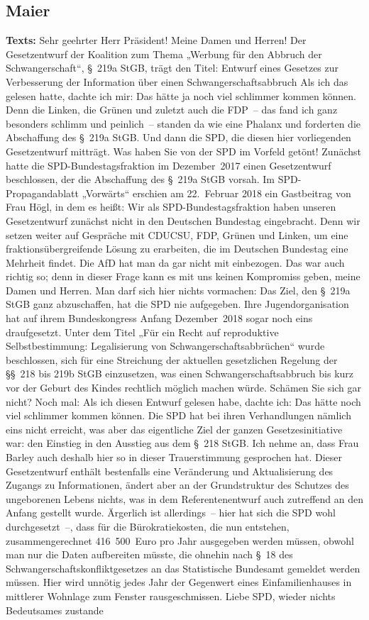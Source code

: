 \documentclass{article}
\begin{document}
\subsection{Maier}
\noindent\textbf{Texts:} Sehr geehrter Herr Präsident! Meine Damen und Herren! Der Gesetzentwurf der Koalition zum Thema „Werbung für den Abbruch der Schwangerschaft“, § 219a StGB, trägt den Titel: Entwurf eines Gesetzes zur Verbesserung der Information über einen Schwangerschaftsabbruch Als ich das gelesen hatte, dachte ich mir: Das hätte ja noch viel schlimmer kommen können. Denn die Linken, die Grünen und zuletzt auch die FDP – das fand ich ganz besonders schlimm und peinlich – standen da wie eine Phalanx und forderten die Abschaffung des § 219a StGB.  Und dann die SPD, die diesen hier vorliegenden Gesetzentwurf mitträgt. Was haben Sie von der SPD im Vorfeld getönt! Zunächst hatte die SPD-Bundestagsfraktion im Dezember 2017 einen Gesetzentwurf beschlossen, der die Abschaffung des § 219a StGB vorsah.  Im SPD-Propagandablatt „Vorwärts“ erschien am 22. Februar 2018 ein Gastbeitrag von Frau Högl,  in dem es heißt: Wir als SPD-Bundestagsfraktion haben unseren Gesetzentwurf zunächst nicht in den Deutschen Bundestag eingebracht. Denn wir setzen weiter auf Gespräche mit CDU\/CSU, FDP, Grünen und Linken, um eine fraktionsübergreifende Lösung zu erarbeiten, die im Deutschen Bundestag eine Mehrheit findet. Die AfD hat man da gar nicht mit einbezogen.  Das war auch richtig so; denn in dieser Frage kann es mit uns keinen Kompromiss geben, meine Damen und Herren.  Man darf sich hier nichts vormachen: Das Ziel, den § 219a StGB ganz abzuschaffen, hat die SPD nie aufgegeben.  Ihre Jugendorganisation hat auf ihrem Bundeskongress Anfang Dezember 2018 sogar noch eins draufgesetzt.  Unter dem Titel „Für ein Recht auf reproduktive Selbstbestimmung: Legalisierung von Schwangerschaftsabbrüchen“ wurde beschlossen, sich für eine Streichung der aktuellen gesetzlichen Regelung der §§ 218 bis 219b StGB einzusetzen,  was einen Schwangerschaftsabbruch bis kurz vor der Geburt des Kindes rechtlich möglich machen würde.  Schämen Sie sich gar nicht?  Noch mal: Als ich diesen Entwurf gelesen habe, dachte ich: Das hätte noch viel schlimmer kommen können. Die SPD hat bei ihren Verhandlungen nämlich eins nicht erreicht, was aber das eigentliche Ziel der ganzen Gesetzesinitiative war: den Einstieg in den Ausstieg aus dem § 218 StGB.  Ich nehme an, dass Frau Barley auch deshalb hier so in dieser Trauerstimmung gesprochen hat.  Dieser Gesetzentwurf enthält bestenfalls eine Veränderung und Aktualisierung des Zugangs zu Informationen, ändert aber an der Grundstruktur des Schutzes des ungeborenen Lebens nichts, was in dem Referentenentwurf auch zutreffend an den Anfang gestellt wurde. Ärgerlich ist allerdings – hier hat sich die SPD wohl durchgesetzt –, dass für die Bürokratiekosten, die nun entstehen, zusammengerechnet 416 500 Euro pro Jahr ausgegeben werden müssen,  obwohl man nur die Daten aufbereiten müsste, die ohnehin nach § 18 des Schwangerschaftskonfliktgesetzes an das Statistische Bundesamt gemeldet werden müssen. Hier wird unnötig jedes Jahr der Gegenwert eines Einfamilienhauses in mittlerer Wohnlage zum Fenster rausgeschmissen.  Liebe SPD, wieder nichts Bedeutsames zustande 
\end{document}
